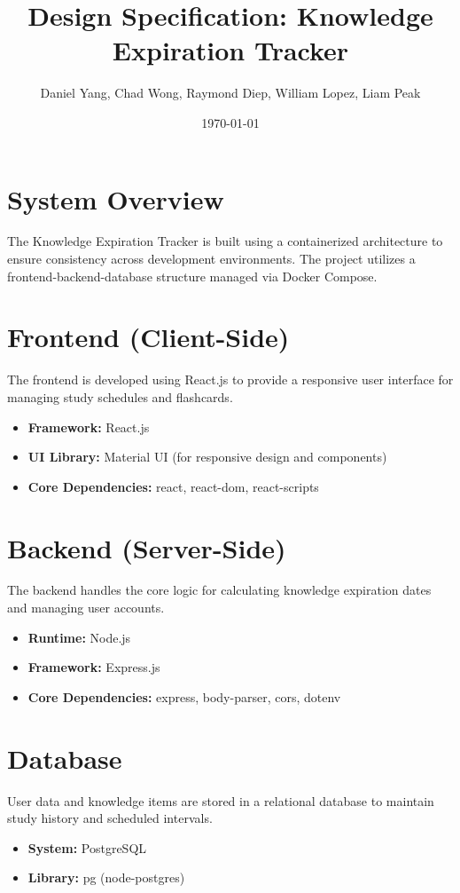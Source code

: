 \documentclass{article}
\title{Design Specification: Knowledge Expiration Tracker}
\author{Daniel Yang, Chad Wong, Raymond Diep, William Lopez, Liam Peak}
\date{\today}
\begin{document}
\maketitle
\newpage

\section{System Overview}
The Knowledge Expiration Tracker is built using a containerized architecture to ensure consistency across development environments. The project utilizes a frontend-backend-database structure managed via Docker Compose.

\section{Frontend (Client-Side)}
The frontend is developed using React.js to provide a responsive user interface for managing study schedules and flashcards.
\begin{itemize}
    \item \textbf{Framework:} React.js
    \item \textbf{UI Library:} Material UI (for responsive design and components)
    \item \textbf{Core Dependencies:} react, react-dom, react-scripts
\end{itemize}

\section{Backend (Server-Side)}
The backend handles the core logic for calculating knowledge expiration dates and managing user accounts.
\begin{itemize}
    \item \textbf{Runtime:} Node.js
    \item \textbf{Framework:} Express.js
    \item \textbf{Core Dependencies:} express, body-parser, cors, dotenv
\end{itemize}

\section{Database}
User data and knowledge items are stored in a relational database to maintain study history and scheduled intervals.
\begin{itemize}
    \item \textbf{System:} PostgreSQL
    \item \textbf{Library:} pg (node-postgres)
\end{itemize}
\end{document}
